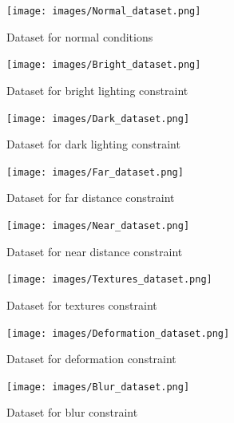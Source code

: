 \begin{figure}
    \centering
    \texttt{[image: images/Normal\_dataset.png]}
    \caption{Dataset for normal conditions}
    \label{fig:normal_dataset}
\end{figure}

\begin{figure}
    \centering
    \texttt{[image: images/Bright\_dataset.png]}
    \caption{Dataset for bright lighting constraint}
    \label{fig:bright_dataset}
\end{figure}

\begin{figure}
    \centering
    \texttt{[image: images/Dark\_dataset.png]}
    \caption{Dataset for dark lighting constraint}
    \label{fig:dark_dataset}
\end{figure}

\begin{figure}
    \centering
    \texttt{[image: images/Far\_dataset.png]}
    \caption{Dataset for far distance constraint}
    \label{fig:far_dataset}
\end{figure}

\begin{figure}
    \centering
    \texttt{[image: images/Near\_dataset.png]}
    \caption{Dataset for near distance constraint}
    \label{fig:near_dataset}
\end{figure}

\begin{figure}
    \centering
    \texttt{[image: images/Textures\_dataset.png]}
    \caption{Dataset for textures constraint}
    \label{fig:textures_dataset}
\end{figure}

\begin{figure}
    \centering
    \texttt{[image: images/Deformation\_dataset.png]}
    \caption{Dataset for deformation constraint}
    \label{fig:deformation_dataset}
\end{figure}

\begin{figure}
    \centering
    \texttt{[image: images/Blur\_dataset.png]}
    \caption{Dataset for blur constraint}
    \label{fig:blur_dataset}
\end{figure}

